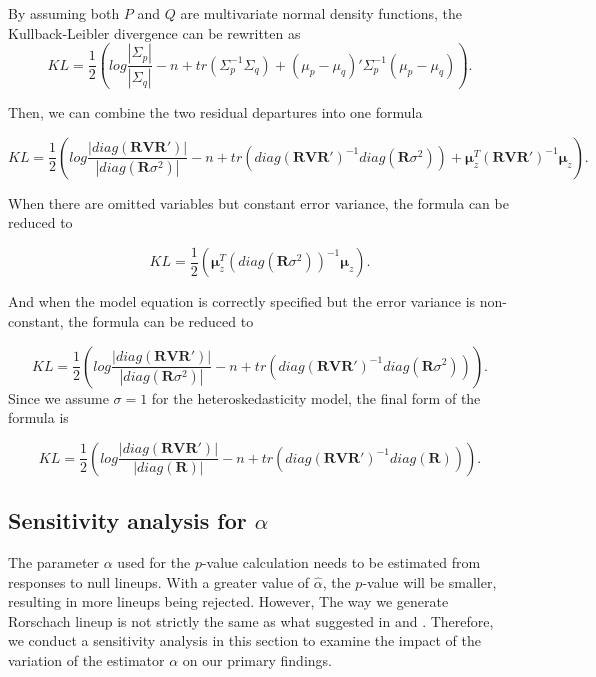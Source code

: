 \documentclass[]{interact}
\theoremstyle{plain}%
\theoremstyle{definition}
\theoremstyle{remark}
\begin{document}
By assuming both \(P\) and \(Q\) are multivariate normal density
functions, the Kullback-Leibler divergence can be rewritten as
\[KL = \frac{1}{2}\left(log\frac{|\Sigma_p|}{|\Sigma_q|} - n + tr(\Sigma_p^{-1}\Sigma_q) + (\mu_p - \mu_q)'\Sigma_p^{-1}(\mu_p - \mu_q)\right).\]

Then, we can combine the two residual departures into one formula

\small

\begin{equation*}
\label{eq:effect-size}
KL = \frac{1}{2}\left(log\frac{|diag(\boldsymbol{R}\boldsymbol{V}\boldsymbol{R}')|}{|diag(\boldsymbol{R}\sigma^2)|} - n + tr(diag(\boldsymbol{R}\boldsymbol{V}\boldsymbol{R}')^{-1}diag(\boldsymbol{R}\sigma^2)) + \boldsymbol{\mu}_z^{T}(\boldsymbol{R}\boldsymbol{V}\boldsymbol{R}')^{-1}\boldsymbol{\mu}_z\right).
\end{equation*}

\normalsize

When there are omitted variables but constant error variance, the
formula can be reduced to

\[KL = \frac{1}{2}\left(\boldsymbol{\mu}_z^{T}(diag(\boldsymbol{R}\sigma^2))^{-1}\boldsymbol{\mu}_z\right).\]

And when the model equation is correctly specified but the error
variance is non-constant, the formula can be reduced to

\[KL = \frac{1}{2}\left(log\frac{|diag(\boldsymbol{R}\boldsymbol{V}\boldsymbol{R}')|}{|diag(\boldsymbol{R}\sigma^2)|} - n + tr(diag(\boldsymbol{R}\boldsymbol{V}\boldsymbol{R}')^{-1}diag(\boldsymbol{R}\sigma^2))\right).\]
Since we assume \(\sigma = 1\) for the heteroskedasticity model, the
final form of the formula is

\[KL = \frac{1}{2}\left(log\frac{|diag(\boldsymbol{R}\boldsymbol{V}\boldsymbol{R}')|}{|diag(\boldsymbol{R})|} - n + tr(diag(\boldsymbol{R}\boldsymbol{V}\boldsymbol{R}')^{-1}diag(\boldsymbol{R}))\right).\]

\hypertarget{sensitivity-analysis-for-alpha}{%
\subsection{\texorpdfstring{Sensitivity analysis for
\(\alpha\)}{Sensitivity analysis for \textbackslash alpha}}\label{sensitivity-analysis-for-alpha}}

The parameter \(\alpha\) used for the \(p\)-value calculation needs to
be estimated from responses to null lineups. With a greater value of
\(\hat{\alpha}\), the \(p\)-value will be smaller, resulting in more
lineups being rejected. However, The way we generate Rorschach lineup is
not strictly the same as what suggested in
\citet{vanderplas2021statistical} and \citet{buja_statistical_2009}.
Therefore, we conduct a sensitivity analysis in this section to examine
the impact of the variation of the estimator \(\alpha\) on our primary
findings.
\end{document}
